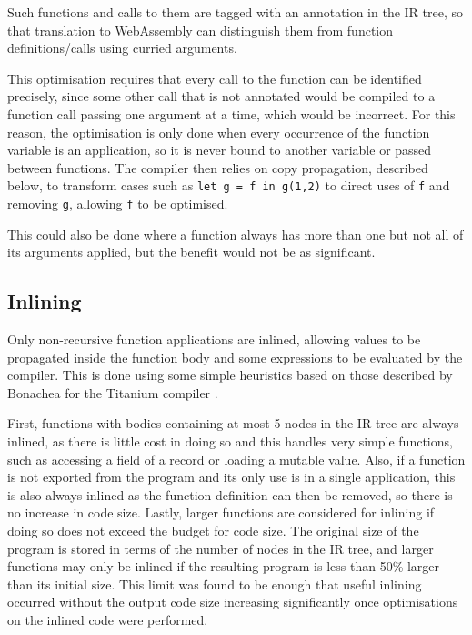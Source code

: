 Such functions and calls to them are tagged with an annotation in the IR tree, so that translation to WebAssembly can distinguish them from function definitions/calls using curried arguments. 

This optimisation requires that every call to the function can be identified precisely, since some other call that is not annotated would be compiled to a function call passing one argument at a time, which would be incorrect. For this reason, the optimisation is only done when every occurrence of the function variable is an application, so it is never bound to another variable or passed between functions. The compiler then relies on copy propagation, described below, to transform cases such as  \verb|let g = f in g(1,2)| to direct uses of \verb|f| and removing \verb|g|, allowing \verb|f| to be optimised. 

This could also be done where a function always has more than one but not all of its arguments applied, but the benefit would not be as significant.


\subsection{Inlining}
Only non-recursive function applications are inlined, allowing values to be propagated inside the function body and some expressions to be evaluated by the compiler. This is done using some simple heuristics based on those described by Bonachea for the Titanium compiler \cite{titanium}. 

First, functions with bodies containing at most 5 nodes in the IR tree are always inlined, as there is little cost in doing so and this handles very simple functions, such as accessing a field of a record or loading a mutable value. Also, if a function is not exported from the program and its only use is in a single application, this is also always inlined as the function definition can then be removed, so there is no increase in code size.
 Lastly, larger functions are considered for inlining if doing so does not exceed the budget for code size. The original size of the program is stored in terms of the number of nodes in the IR tree, and larger functions may only be inlined if the resulting program is less than 50\% larger than its initial size. This limit was found to be enough that useful inlining occurred without the output code size increasing significantly once optimisations on the inlined code were performed.




